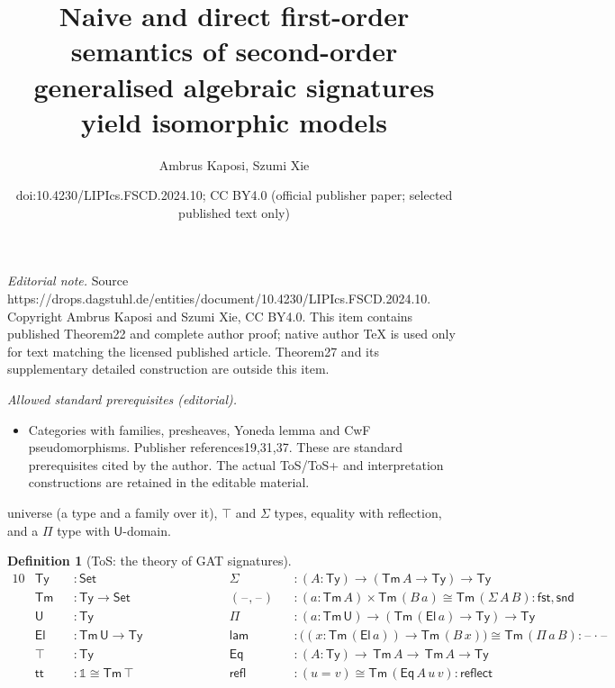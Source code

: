 \documentclass[10pt,a4paper]{amsart}
\title{Naive and direct first-order semantics of second-order generalised algebraic signatures yield isomorphic models}
\author{Ambrus Kaposi, Szumi Xie}
\date{doi:10.4230/LIPIcs.FSCD.2024.10; CC BY4.0 (official publisher paper; selected published text only)}
\newtheorem{definition}[theorem]{Definition}
\providecommand{\vmathbb}[1]{\mathbb{#1}}
\newcommand{\Ty}{\mathsf{Ty}}
\newcommand{\Tm}{\mathsf{Tm}}
\newcommand{\Set}{\mathsf{Set}}
\newcommand{\U}{\mathsf{U}}
\newcommand{\El}{\mathsf{El}}
\newcommand{\ra}{\rightarrow}
\newcommand{\blank}{\mathord{\hspace{1pt}\text{--}\hspace{1pt}}} %
\newcommand{\lam}{\mathsf{lam}}
\newcommand{\Eq}{\mathsf{Eq}}
\renewcommand{\tt}{\mathsf{tt}}
\begin{document}
\maketitle
\noindent\textit{Editorial note.} Source https://drops.dagstuhl.de/entities/document/10.4230/LIPIcs.FSCD.2024.10. Copyright Ambrus Kaposi and Szumi Xie, CC BY4.0. This item contains published Theorem22 and complete author proof; native author TeX is used only for text matching the licensed published article. Theorem27 and its supplementary detailed construction are outside this item.\par\medskip
\noindent\textit{Allowed standard prerequisites (editorial).}\begin{itemize}
\item Categories with families, presheaves, Yoneda lemma and CwF pseudomorphisms. Publisher references19,31,37. These are standard prerequisites cited by the author. The actual ToS/ToS+ and interpretation constructions are retained in the editable material.
\end{itemize}\medskip
\setcounter{theorem}{11}
universe (a type and a family over it), $\top$ and $\Sigma$ types,
equality with reflection, and a $\Pi$ type with $\U$-domain.
\pagebreak
\begin{definition}[ToS: the theory of GAT signatures]\label{def:gat}
  \begin{alignat*}{10}
    & \Ty && : \Set                                             && \Sigma && :(A:\Ty)\ra(\Tm\,A\ra\Ty)\ra\Ty \\
    & \Tm && : \Ty\ra\Set                                       && (\blank,\blank) && : (a:\Tm\,A)\times\Tm\,(B\,a)\cong\Tm\,(\Sigma\,A\,B) : \mathsf{fst},\mathsf{snd} \\         
    & \U  && : \Ty                                              && \Pi && : (a:\Tm\,\U)\ra(\Tm\,(\El\,a)\ra\Ty)\ra\Ty \\                                                 
    & \El && : \Tm\,\U\ra\Ty                                    && \lam && : \big((x:\Tm\,(\El\,a))\ra\Tm\,(B\,x)\big)\cong\Tm\,(\Pi\,a\,B) : \blank\cdot\blank \\     
    & \top && : \Ty                                             && \Eq && : (A:\Ty)\ra\,\Tm\,A\ra\,\Tm\,A\ra\Ty \\                                                                 
    & \tt && : \vmathbb{1} \cong \Tm\,\top \hspace{6em} && \mathsf{refl} && : (u = v)\cong\Tm\,(\Eq\,A\,u\,v) : \mathsf{reflect}                                    
  \end{alignat*}
\end{definition}
\end{document}
